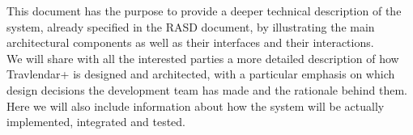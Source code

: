 This document has the purpose to provide a deeper technical description of the system, already specified in the RASD document, by illustrating the main architectural components as well as their interfaces and their interactions. \\
We will share with all the interested parties a more detailed description of how Travlendar+ is designed and architected, with a particular emphasis on which design decisions the development team has made and the rationale behind them. \\
Here we will also include information about how the system will be actually implemented, integrated and tested.